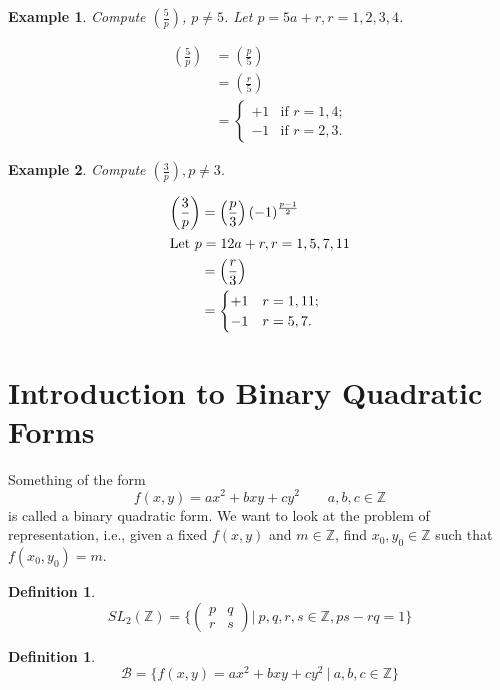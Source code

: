 \documentclass{notes}
\theoremstyle{plain}
\newtheorem{definition}[theorem]{Definition}
\newtheorem*{example}{Example}
\newcommand{\legsym}[2]{\left( \frac{#1}{#2} \right)}
\begin{document}
\begin{example}
  Compute $\legsym{5}{p}$, $p \ne 5$.  Let $p=5a+r, r = 1,2,3,4$.

\begin{align*}
  \legsym{5}{p} &= \legsym{p}{5} \\
  & = \legsym{r}{5} \\
  & =
\begin{cases}
  +1      & \text{if $r = 1,4$;} \\
  -1 & \text{if $r = 2,3$.}
\end{cases}
\end{align*}
\end{example}

\begin{example}
  Compute $\legsym{3}{p}, p \ne 3$.

\begin{align*}
  \legsym{3}{p} &= \legsym{p}{3}(-1)^{\frac{p-1}{2}} \\
  \intertext{Let $p = 12a+r, r = 1,5,7,11$}
  &= \legsym{r}{3} \\
  &=
\begin{cases}
  +1      & r=1,11 \text{;} \\
  -1 & r=5,7 \text{.}
\end{cases}
\end{align*}
\end{example}

\section{Introduction to Binary Quadratic Forms}

Something of the form
\[
f(x,y) = ax^2+bxy+cy^2 \qquad a,b,c \in \mathbb{Z}
\]
is called a binary quadratic form.  We want to look at the problem of
representation, i.e., given a fixed $f(x,y)$ and $m \in \mathbb{Z}$,
find $x_0,y_0 \in \mathbb{Z}$ such that $f(x_0,y_0)=m$.

\begin{definition}
\[
SL_2(\mathbb{Z}) = \{ \left(
\begin{matrix}
  p       & q \\
  r & s
\end{matrix}
\right) |\: p,q,r,s \in \mathbb{Z}, ps-rq = 1 \}
\]
\end{definition}

\begin{definition}
\[
\mathcal{B} = \{ f(x,y) = ax^2+bxy+cy^2 \: | \: a,b,c \in \mathbb{Z}
\}
\]
\end{definition}
\end{document}
